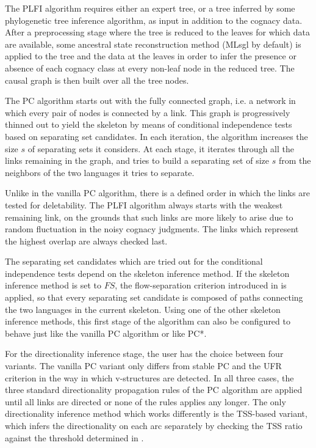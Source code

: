 The PLFI algorithm requires either an expert tree, or a tree inferred by some phylogenetic tree inference algorithm, as input in addition to the cognacy data. After a preprocessing stage where the tree is reduced to the leaves for which data are available, some ancestral state reconstruction method (MLsgl by default) is applied to the tree and the data at the leaves in order to infer the presence or absence of each cognacy class at every non-leaf node in the reduced tree. The causal graph is then built over all the tree nodes.

The PC algorithm starts out with the fully connected graph, i.e. a network in which every pair of nodes is connected by a link. This graph is progressively thinned out to yield the skeleton by means of conditional independence tests based on separating set candidates. In each iteration, the algorithm increases the size $s$ of separating sets it considers. At each stage, it iterates through all the links remaining in the graph, and tries to build a separating set of size $s$ from the neighbors of the two languages it tries to separate.

Unlike in the vanilla PC algorithm, there is a defined order in which the links are tested for deletability. The PLFI algorithm always starts with the weakest remaining link, on the grounds that such links are more likely to arise due to random fluctuation in the noisy cognacy judgments. The links which represent the highest overlap are always checked last.

The separating set candidates which are tried out for the conditional independence tests depend on the skeleton inference method. If the skeleton inference method is set to $FS$, the flow-separation criterion introduced in  is applied, so that every separating set candidate is composed of paths connecting the two languages in the current skeleton. Using one of the other skeleton inference methods, this first stage of the algorithm can also be configured to behave just like the vanilla PC algorithm or like PC*.

For the directionality inference stage, the user has the choice between four variants. The vanilla PC variant only differs from stable PC and the UFR criterion in the way in which v-structures are detected. In all three cases, the three standard directionality propagation rules of the PC algorithm are applied until all links are directed or none of the rules applies any longer. The only directionality inference method which works differently is the TSS-based variant, which infers the directionality on each arc separately by checking the TSS ratio against the threshold determined in . 


